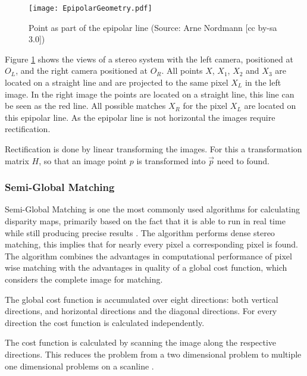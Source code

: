 \begin{figure}[h!]
    \centering
    \texttt{[image: EpipolarGeometry.pdf]}
    \caption{Point as part of the epipolar line (Source: Arne Nordmann [cc by-sa 3.0])}
    \label{fig:theo:epipolarLine}
\end{figure}

Figure \ref{fig:theo:epipolarLine} shows the views of a stereo system with the left camera, positioned at $O_L$, and the right camera positioned at $O_R$. 
All points $X$, $X_1$, $X_2$ and $X_3$ are located on a straight line and are projected to the same pixel $X_L$ in the left image. 
In the right image the points are located on a straight line, this line can be seen as the red line. 
All possible matches $X_R$ for the pixel $X_L$ are located on this epipolar line.
As the epipolar line is not horizontal the images require rectification.

Rectification is done by linear transforming the images. For this a transformation matrix $H$, so that an image point $p$ is transformed into $\vec{p}$ need to found.

\subsubsection{Semi-Global Matching} \label{sec:theo:sgm}
Semi-Global Matching \cite{Hirsch05} \cite{sgm2} is one the most commonly used \cite{stereoHaw10} algorithms for calculating disparity maps, primarily based on the fact that it is able to run in real time  while still producing precise results \cite{middleburyStereo3}. 
The algorithm performs dense stereo matching, this implies that for nearly every pixel a corresponding pixel is found. 
The algorithm combines the advantages in computational performance of pixel wise matching with the advantages in quality of a global cost function, which considers the complete image for matching.

The global cost function is accumulated over eight directions: both vertical directions, and horizontal directions and the diagonal directions. For every direction the cost function is calculated independently.

The cost function is calculated by scanning the image along the respective directions. 
This reduces the problem from a two dimensional problem to multiple one dimensional problems on a scanline \cite{sgmHeidelberg}.

